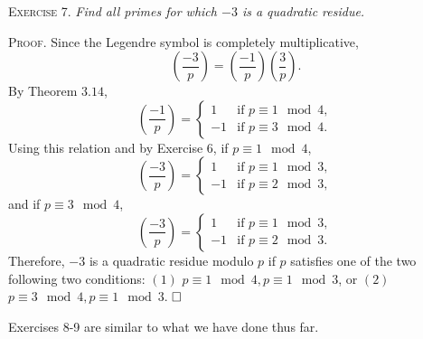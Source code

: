 \documentclass[11pt, leqno]{article}
\newcommand{\done}{\ensuremath{\hfill\square}}
\begin{document}
\textsc{Exercise 7}. \emph{Find all primes for which $-3$ is a quadratic residue.}

\textsc{Proof}. Since the Legendre symbol is completely multiplicative, 
\begin{displaymath}
\left( \frac{-3}{p} \right) = \left( \frac{-1}{p} \right) \left( \frac{3}{p} \right).
\end{displaymath}
By Theorem $3.14$, 
\begin{displaymath}
\left( \frac{-1}{p} \right) =
\begin{cases}
  1 & \text{if } p \equiv 1 \mod 4, \\
  -1 & \text{if } p \equiv 3 \mod 4.
\end{cases}
\end{displaymath}
Using this relation and by Exercise $6$, if $p \equiv 1 \mod 4$, 
\begin{displaymath}
  \left( \frac{-3}{p} \right) =
  \begin{cases}
    1 & \text{if } p \equiv 1 \mod 3,\\
    -1 & \text{if } p \equiv 2 \mod 3,
  \end{cases}
\end{displaymath}
and if $p \equiv 3 \mod 4$, 
\begin{displaymath}
  \left( \frac{-3}{p} \right) =
  \begin{cases}
    1 & \text{if } p \equiv 1 \mod 3,\\
    -1 & \text{if } p \equiv 2 \mod 3.
  \end{cases}
\end{displaymath}
Therefore, $-3$ is a quadratic residue modulo $p$ if $p$ satisfies one of the two following two conditions: $(1)$ $p \equiv 1 \mod 4, p \equiv 1 \mod 3$, or $(2)$ $p \equiv 3 \mod 4, p \equiv 1 \mod 3$. \done

Exercises 8-9 are similar to what we have done thus far.
\end{document}
